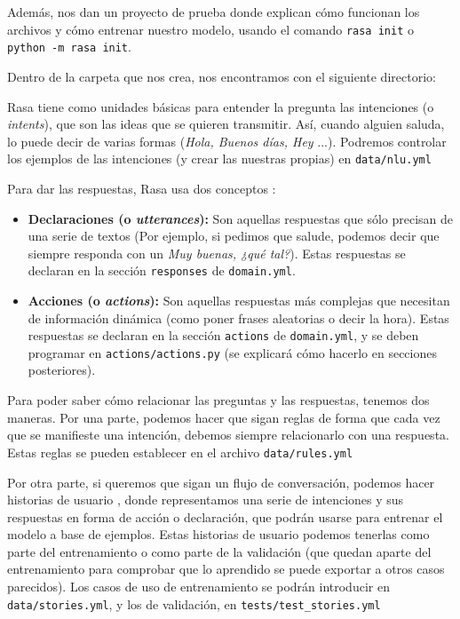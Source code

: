 Además, nos dan un proyecto de prueba donde explican cómo funcionan los archivos y cómo entrenar nuestro modelo, usando el comando \texttt{rasa init} o \texttt{python -m rasa init}.

Dentro de la carpeta que nos crea, nos encontramos con el siguiente directorio:



Rasa tiene como unidades básicas para entender la pregunta las intenciones (o \textit{intents}), que son las ideas que se quieren transmitir. Así, cuando alguien saluda, lo puede decir de varias formas (\textit{Hola, Buenos días, Hey} ...). Podremos controlar los ejemplos de las intenciones (y crear las nuestras propias) en \texttt{data/nlu.yml}

Para dar las respuestas, Rasa usa dos conceptos \cite{rasa-respuestas}:
\begin{itemize}
	\item \textbf{Declaraciones (o \textit{utterances}):} Son aquellas respuestas que sólo precisan de una serie de textos (Por ejemplo, si pedimos que salude, podemos decir que siempre responda con un \textit{Muy buenas, ¿qué tal?}). Estas respuestas se declaran en la sección \texttt{responses} de \texttt{domain.yml}.
	\item \textbf{Acciones (o \textit{actions}):} Son aquellas respuestas más complejas que necesitan de información dinámica (como poner frases aleatorias o decir la hora). Estas respuestas se declaran en la sección \texttt{actions} de \texttt{domain.yml}, y se deben programar en \texttt{actions/actions.py} (se explicará cómo hacerlo en secciones posteriores).
\end{itemize}

Para poder saber cómo relacionar las preguntas y las respuestas, tenemos dos maneras. Por una parte, podemos hacer que sigan reglas \cite{rasa-rules} de forma que cada vez que se manifieste una intención, debemos siempre relacionarlo con una respuesta. Estas reglas se pueden establecer en el archivo \texttt{data/rules.yml}

Por otra parte, si queremos que sigan un flujo de conversación, podemos hacer historias de usuario \cite{rasa-stories}, donde representamos una serie de intenciones y sus respuestas en forma de acción o declaración, que podrán usarse para entrenar el modelo a base de ejemplos. Estas historias de usuario podemos tenerlas como parte del entrenamiento o como parte de la validación (que quedan aparte del entrenamiento para comprobar que lo aprendido se puede exportar a otros casos parecidos). Los casos de uso de entrenamiento se podrán introducir en \texttt{data/stories.yml}, y los de validación, en \texttt{tests/test\_stories.yml}

